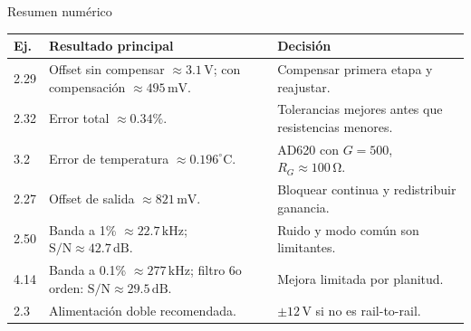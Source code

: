 \documentclass[aspectratio=169,9pt]{beamer}
\newcommand{\unit}[1]{\,\mathrm{#1}}
\newcommand{\SN}{\mathrm{S/N}}
\begin{document}
\begin{frame}{Resumen numérico}
  \small
  \begin{tabularx}{\textwidth}{@{}lXl@{}}
    \toprule
    \textbf{Ej.} & \textbf{Resultado principal} & \textbf{Decisión}\\
    \midrule
    2.29 & Offset sin compensar \(\approx 3.1\unit{V}\); con compensación \(\approx 495\unit{mV}\). & Compensar primera etapa y reajustar.\\
    2.32 & Error total \(\approx 0.34\%\). & Tolerancias mejores antes que resistencias menores.\\
    3.2 & Error de temperatura \(\approx 0.196^\circ\mathrm{C}\). & AD620 con \(G=500\), \(R_G\approx100\unit{\Omega}\).\\
    2.27 & Offset de salida \(\approx 821\unit{mV}\). & Bloquear continua y redistribuir ganancia.\\
    2.50 & Banda a 1\% \(\approx 22.7\unit{kHz}\); \(\SN\approx42.7\unit{dB}\). & Ruido y modo común son limitantes.\\
    4.14 & Banda a 0.1\% \(\approx277\unit{kHz}\); filtro 6o orden: \(\SN\approx29.5\unit{dB}\). & Mejora limitada por planitud.\\
    2.3 & Alimentación doble recomendada. & \(\pm12\unit{V}\) si no es rail-to-rail.\\
    \bottomrule
  \end{tabularx}
\end{frame}
\end{document}
